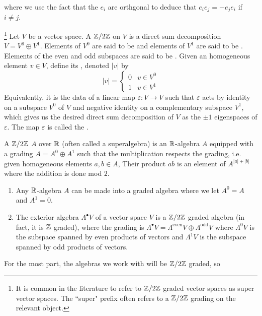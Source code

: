 where we use the fact that the $e_i$ are orthgonal to deduce that $e_ie_j = -e_je_i$
if $i \neq j$.
%
\begin{defn}\footnote{It is common in the literature to refer to $\mathbb{Z}/2\mathbb{Z}$
graded vector spaces as super vector spaces. The ``super" prefix often refers
to a $\mathbb{Z}/2\mathbb{Z}$ grading on the relevant object.}
Let $V$ be a vector space. A $\mathbb{Z} /2\mathbb{Z}$  on $V$ is a direct sum
decomposition $V = V^0 \oplus V^1$. Elements of $V^0$ are said to be 
and elements of $V^1$ are said to be . Elements of the even and odd
subspaces are said to be . Given an homogeneous element
$v \in V$, define its , denoted $|v|$ by
\[
|v| = \begin{cases}
0 & v \in V^0 \\
1 & v \in V^1
\end{cases}
\]
Equivalently, it is the data of a linear map
$\varepsilon : V \to V$ such that $\varepsilon$ acts by identity on a subspace $V^0$
of $V$ and negative identity on a complementary subspace $V^1$, which gives us the
desired direct sum decomposition of $V$ as the $\pm 1$ eigenspaces of $\varepsilon$.
The map $\varepsilon$ is called the .

\end{defn}
%
\begin{defn}
A $\mathbb{Z}/2\mathbb{Z}$  $A$ over $\mathbb{R}$ (often called a superalgebra) is
an $\mathbb{R}$-algebra $A$ equipped with a grading $A = A^0 \oplus A^1$ such that
the multiplication respects the grading, i.e. given homogeneous elements
$a,b \in A$, Their product $ab$ is an element of $A^{|a| + |b|}$ where the
addition is done mod $2$.
\end{defn}
%
\begin{exmp}\enumbreak
\begin{enumerate}
  \item Any $\mathbb{R}$-algebra $A$ can be made into a graded algebra where we let
  $A^0 = A$ and $A^1 = 0$.
  \item The exterior algebra $\Lambda^\bullet V$ of a vector space $V$ is
  a $\mathbb{Z}/2\mathbb{Z}$ graded algebra (in fact, it is $\mathbb{Z}$ graded), where the grading is
  $\Lambda^\bullet V = \Lambda^{\text{even}} V \oplus \Lambda^{\text{odd}} V$
  where $\Lambda^0 V$ is the subspace spanned by even products of vectors and
  $\Lambda^1 V$ is the subspace spanned by odd products of vectors.
\end{enumerate}
\end{exmp}
%
For the most part, the algebras we work with will be $\mathbb{Z}/2\mathbb{Z}$ graded, so
